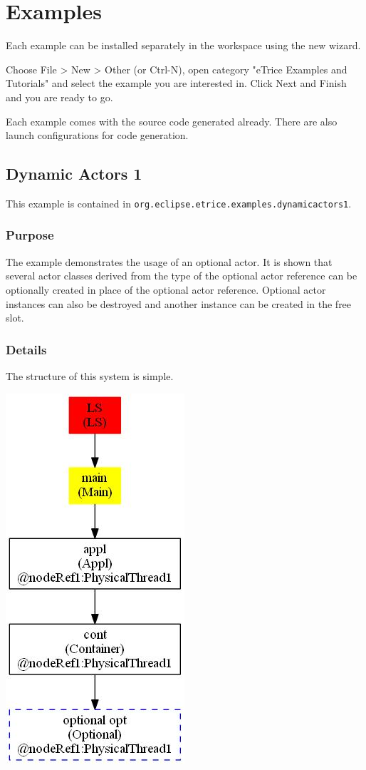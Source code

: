 \chapter{Examples}

Each example can be installed separately in the workspace using the new wizard.

Choose File > New > Other (or Ctrl-N), open category "eTrice Examples and Tutorials" and select the example you are
interested in. Click Next and Finish and you are ready to go.

Each example comes with the source code generated already. There are also launch configurations for code generation.

\section{Dynamic Actors 1}

This example is contained in \texttt{org.eclipse.etrice.examples.dynamicactors1}.

\subsection{Purpose}

The example demonstrates the usage of an optional actor. It is shown that several actor classes
derived from the type of the optional actor reference can be optionally created in place
of the optional actor reference. Optional actor instances can also be destroyed
and another instance can be created in the free slot.

\subsection{Details}

The structure of this system is simple.

\includegraphics[scale=0.7]{images/039-DynAct1-Main_instanceTree.jpg}

